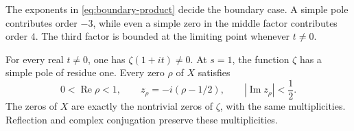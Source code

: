 The exponents in \eqref{eq:boundary-product} decide the boundary case.
A simple pole contributes order $-3$, while even a simple zero in the
middle factor contributes order $4$.
The third factor is bounded at the limiting point whenever $t\ne0$.

\begin{theorem}
\label{thm:strict-strip}
For every real $t\ne0$, one has $\zeta(1+it)\ne0$.
At $s=1$, the function $\zeta$ has a simple pole of residue one.
Every zero $\rho$ of $X$ satisfies
\begin{equation}
 0<\operatorname{Re}\rho<1,
 \qquad
 z_\rho=-i(\rho-1/2),
 \qquad
 |\operatorname{Im}z_\rho|<\frac12.
 \label{eq:strict-strip}
\end{equation}
The zeros of $X$ are exactly the nontrivial zeros of $\zeta$, with
the same multiplicities.
Reflection and complex conjugation preserve these multiplicities.
\end{theorem}
